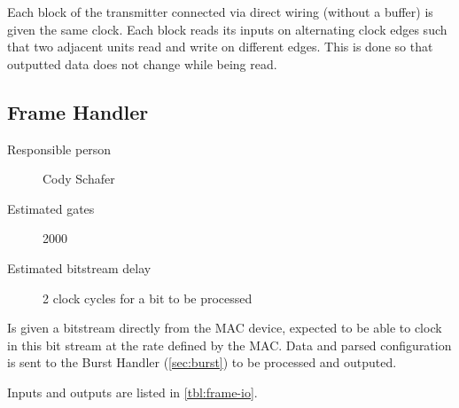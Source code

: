 \documentclass[dvips,10pt,twocolumn]{article}
\begin{document}
Each block of the transmitter connected via direct wiring (without a
buffer) is given the same clock. Each block reads its inputs on alternating
clock edges such that two adjacent units read and write on different edges.
This is done so that outputted data does not change while being read.


\subsection{Frame Handler}
\begin{description}
	\item[Responsible person] Cody Schafer
	\item[Estimated gates] 2000
	\item[Estimated bitstream delay] 2 clock cycles for a bit to be
		processed 
\end{description}

Is given a bitstream directly from the MAC device, expected to be able to
clock in this bit stream at the rate defined by the MAC. Data and
parsed configuration is sent to the Burst Handler (\autoref{sec:burst})
to be processed and outputed.

Inputs and outputs are listed in \autoref{tbl:frame-io}.
\end{document}
